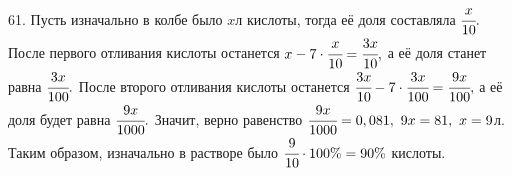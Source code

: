 61. Пусть изначально в колбе было $x$л кислоты, тогда её доля составляла $\cfrac{x}{10}.$ После первого отливания кислоты останется $x-7\cdot\cfrac{x}{10}=\cfrac{3x}{10},$ а её доля станет равна $\cfrac{3x}{100}.$ После второго отливания кислоты останется $\cfrac{3x}{10}-7\cdot\cfrac{3x}{100}=\cfrac{9x}{100},$ а её доля будет равна $\cfrac{9x}{1000}.$ Значит, верно равенство $\cfrac{9x}{1000}=0,081,\ 9x=81,\ x=9$л. Таким образом, изначально в растворе было $\cfrac{9}{10}\cdot100\%=90\%$ кислоты.\\
